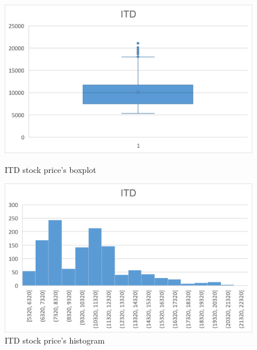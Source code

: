 \documentclass{ieeeojies}
\begin{document}
\begin{figure}[H]
    \centering
    \begin{minipage}{0.23\textwidth}
    \centering
    \includegraphics[width=1\textwidth]{bibliography/Figure/ITD_Quantiles.png}
    \caption{ITD stock price's boxplot}
    \label{fig:1}
    \end{minipage}
    \hfill
    \begin{minipage}{0.23\textwidth}
    \centering
    \includegraphics[width=1\textwidth]{bibliography/Figure/ITD_Bar.png}
    \caption{ITD stock price's histogram}
    \label{fig:2}
    \end{minipage}
\end{figure}
\end{document}
